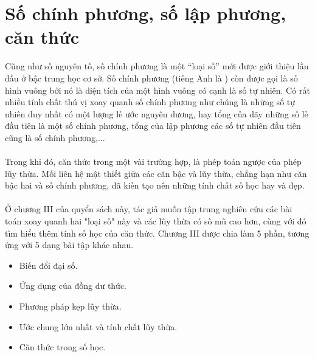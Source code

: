 \chapter{Số chính phương, số lập phương, căn thức}

Cũng như số nguyên tố, số chính phương là một “loại số” mới được giới thiệu lần đầu ở bậc trung học cơ sở. Số chính phương (tiếng Anh là ) còn được gọi là số hình vuông bởi nó là diện tích của một hình vuông có cạnh là số tự nhiên. Có rất nhiều tính chất thú vị xoay quanh số chính phương như chúng là những số tự nhiên duy nhất có một lượng lẻ ước nguyên dương, hay tổng của dãy những số lẻ đầu tiên là một số chính phương, tổng của lập phương các số tự nhiên đầu tiên cũng là số chính phương,...\\ \\
Trong khi đó, căn thức trong một vài trường hợp, là phép toán ngược của phép lũy thừa. Mối liên hệ mật thiết giữa các căn bậc và lũy thừa, chẳng hạn như căn bậc hai và số chính phương, đã kiến tạo nên những tính chất số học hay và đẹp.
\\ \\
Ở chương III của quyển sách này, tác giả muốn tập trung nghiên cứu các bài toán xoay quanh hai "loại số" này và các lũy thừa có số mũ cao hơn, cùng với đó tìm hiểu thêm tính số học của căn thức. Chương III được chia làm 5 phần, tương ứng với 5 dạng bài tập khác nhau.
\begin{itemize}
    \item{} Biến đổi đại số.
    \item{} Ứng dụng của đồng dư thức.
    \item{} Phương pháp kẹp lũy thừa.
    \item{} Ước chung lớn nhất và tính chất lũy thừa.
    \item{} Căn thức trong số học.
\end{itemize}

